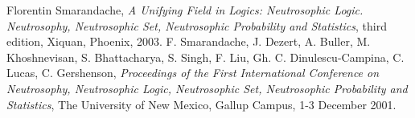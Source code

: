 \documentclass[12pt]{article}
\begin{document}
\begin{thebibliography}{9}
 Florentin Smarandache, {\em A Unifying Field in Logics: Neutrosophic Logic. Neutrosophy, Neutrosophic Set, Neutrosophic Probability and Statistics}, third edition, Xiquan, Phoenix, 2003.
 F. Smarandache, J. Dezert, A. Buller, M. Khoshnevisan, S. Bhattacharya, S. Singh, F. Liu, Gh. C. Dinulescu-Campina, C. Lucas, C. Gershenson, {\em Proceedings of the First International Conference on Neutrosophy, Neutrosophic Logic, Neutrosophic Set, Neutrosophic Probability and Statistics}, The University of New Mexico, Gallup Campus, 1-3 December 2001.
\end{thebibliography}
\end{document}
